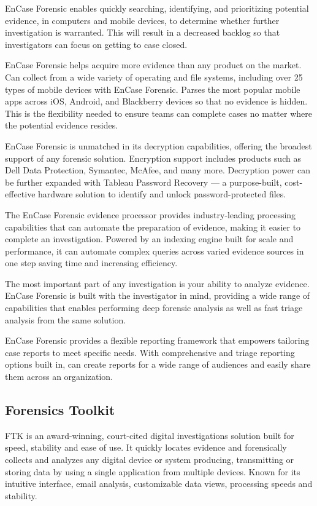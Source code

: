 EnCase Forensic enables quickly searching, identifying, and prioritizing potential evidence, in computers and mobile devices, to determine whether 
further investigation is warranted. This will result in a decreased backlog so that investigators can focus on getting to case closed. 

EnCase Forensic helps acquire more evidence than any product on the market. Can collect from a wide variety of operating and file systems, 
including over 25 types of mobile devices with EnCase Forensic. Parses the most popular mobile apps across iOS, Android, and Blackberry devices so that 
no evidence is hidden. This is the flexibility needed to ensure teams can complete cases no matter where the potential evidence resides.

EnCase Forensic is unmatched in its decryption capabilities, offering the broadest support of any forensic solution. Encryption support includes products 
such as Dell Data Protection, Symantec, McAfee, and many more. Decryption power can be further expanded with Tableau Password 
Recovery — a purpose-built, cost-effective hardware solution to identify and unlock password-protected files. 

The EnCase Forensic evidence processor provides industry-leading processing capabilities that can automate the preparation of evidence, making 
it easier to complete an investigation. Powered by an indexing engine built for scale and performance, it can automate complex queries across 
varied evidence sources in one step saving time and increasing efficiency. 

The most important part of any investigation is your ability to analyze evidence. EnCase Forensic is built with the investigator in mind, 
providing a wide range of capabilities that enables performing deep forensic analysis as well as fast triage analysis from the same solution. 

EnCase Forensic provides a flexible reporting framework that empowers tailoring case reports to meet specific needs. With comprehensive 
and triage reporting options built in, can create reports for a wide range of audiences and easily share them across an organization. 

\subsection{Forensics Toolkit}

FTK is an award-winning, court-cited digital investigations solution built for speed, stability and ease of use. It quickly 
locates evidence and forensically collects and analyzes any digital device or system producing, transmitting or 
storing data by using a single application from multiple devices. Known for its intuitive interface, email analysis, 
customizable data views, processing speeds and stability.

